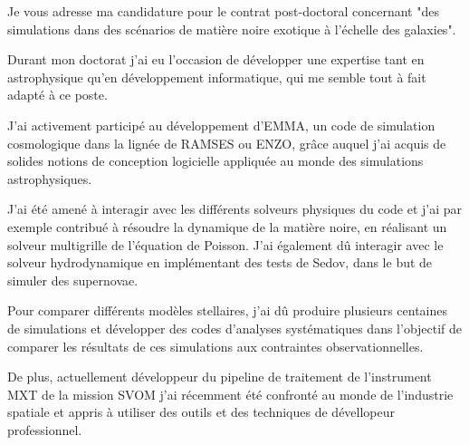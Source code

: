 \documentclass[12pt,stdletter,orderfromtodate,sigleft]{newlfm}
\begin{document}
\begin{newlfm}




Je vous adresse ma candidature pour le contrat post-doctoral concernant "des simulations dans des scénarios de matière noire exotique à l'échelle des galaxies".

Durant mon doctorat j'ai eu l'occasion de développer une expertise tant en astrophysique qu'en développement informatique, qui me semble tout à fait adapté à ce poste.

J'ai activement participé au développement d'EMMA, un code de simulation cosmologique dans la lignée de RAMSES ou ENZO, grâce auquel j'ai acquis de solides notions de conception logicielle appliquée au monde des simulations astrophysiques.


J'ai été amené à interagir avec les différents solveurs physiques du code et j'ai par exemple contribué à résoudre la dynamique de la matière noire, en réalisant un solveur multigrille de l'équation de Poisson. 
J'ai également dû interagir avec le solveur hydrodynamique en implémentant des tests de Sedov, dans le but de simuler des supernovae.

Pour comparer différents modèles stellaires, j'ai dû produire plusieurs centaines de simulations et développer des codes d'analyses systématiques dans l'objectif de comparer les résultats de ces simulations aux contraintes observationnelles.

De plus, actuellement développeur du pipeline de traitement de l'instrument MXT de la mission SVOM j'ai récemment été confronté au monde de l'industrie spatiale et appris à utiliser des outils et des techniques de dévellopeur professionnel.


\end{newlfm}
\end{document}
